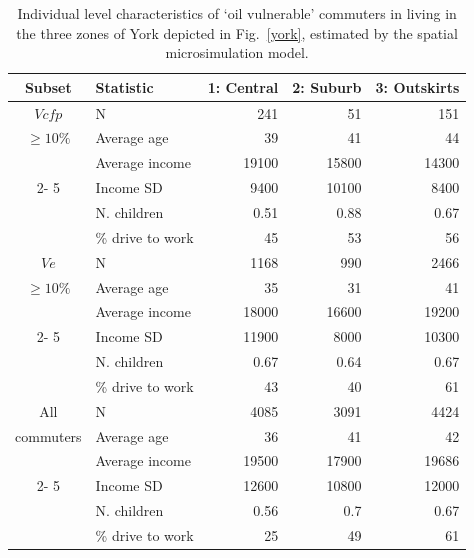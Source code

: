 \documentclass[a4paper, 11pt, twoside]{Thesis}
\begin{document}
\begin{table}[htbp]
\caption[Individual level characteristics
of `oil vulnerable' commuters]{Individual level characteristics
of `oil vulnerable' commuters in living in the three zones of
York depicted in Fig.~\ref{york}, estimated by the spatial microsimulation
model.}
\begin{center}
\begin{tabular}{|c|l|r|r|r|}
\hline
Subset & Statistic & \multicolumn{1}{l|}{1: Central} & \multicolumn{1}{l|}{2:
Suburb} & \multicolumn{1}{l|}{3: Outskirts} \\ \hline
\multicolumn{ 1}{|c|}{$V{cfp}$} & N & 241 & 51 & 151 \\ \cline{ 2- 5}
\multicolumn{ 1}{|c|}{$\geq 10\%$} & Average age & 39 & 41 & 44 \\ \cline{ 2- 5}
\multicolumn{ 1}{|c|}{} & Average income & 19100 & 15800 & 14300 \\ \cline{ 2-
5}
\multicolumn{ 1}{|c|}{} & Income SD & 9400 & 10100 & 8400 \\ \cline{ 2- 5}
\multicolumn{ 1}{|c|}{} & N. children & 0.51 & 0.88 & 0.67 \\ \cline{ 2- 5}
\multicolumn{ 1}{|c|}{} & \% drive to work & 45 & 53 & 56 \\ \hline
\multicolumn{ 1}{|c|}{$V{e}$} & N & 1168 & 990 & 2466 \\ \cline{ 2- 5}
\multicolumn{ 1}{|c|}{$\geq 10\%$} & Average age & 35 & 31 & 41 \\ \cline{ 2- 5}
\multicolumn{ 1}{|c|}{} & Average income & 18000 & 16600 & 19200 \\ \cline{ 2-
5}
\multicolumn{ 1}{|c|}{} & Income SD & 11900 & 8000 & 10300 \\ \cline{ 2- 5}
\multicolumn{ 1}{|c|}{} & N. children & 0.67 & 0.64 & 0.67 \\ \cline{ 2- 5}
\multicolumn{ 1}{|c|}{} & \% drive to work & 43 & 40 & 61 \\ \hline
\multicolumn{ 1}{|c|}{All } & N & 4085 & 3091 & 4424 \\ \cline{ 2- 5}
\multicolumn{ 1}{|c|}{commuters} & Average age & 36 & 41 & 42 \\ \cline{ 2- 5}
\multicolumn{ 1}{|c|}{} & Average income & 19500 & 17900 & 19686 \\ \cline{ 2-
5}
\multicolumn{ 1}{|c|}{} & Income SD & 12600 & 10800 & 12000 \\ \cline{ 2- 5}
\multicolumn{ 1}{|c|}{} & N. children & 0.56 & 0.7 & 0.67 \\ \cline{ 2- 5}
\multicolumn{ 1}{|c|}{} & \% drive to work & 25 & 49 & 61 \\ \hline
\end{tabular}\end{center}
\label{t:ind2}
\end{table}
\end{document}
